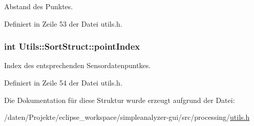Abstand des Punktes. 



Definiert in Zeile 53 der Datei utils.\-h.

\hypertarget{structUtils_1_1SortStruct_ad470a3f9a230e66a47fd022bf7a4a70e}{
\subsubsection[{point\-Index}]{\setlength{\rightskip}{0pt plus 5cm}int Utils\-::\-Sort\-Struct\-::point\-Index}}\label{structUtils_1_1SortStruct_ad470a3f9a230e66a47fd022bf7a4a70e}


Index des entsprechenden Sensordatenpuntkes. 



Definiert in Zeile 54 der Datei utils.\-h.



Die Dokumentation für diese Struktur wurde erzeugt aufgrund der Datei\-:\begin{DoxyCompactItemize}
\item 
/daten/\-Projekte/eclipse\-\_\-workspace/simpleanalyzer-\/gui/src/processing/\hyperlink{utils_8h}{utils.\-h}\end{DoxyCompactItemize}
